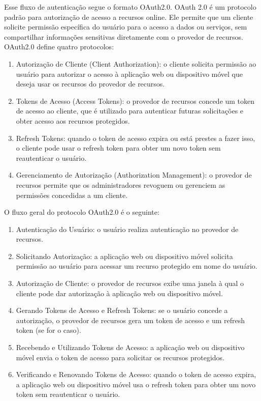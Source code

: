 Esse fluxo de autenticação segue o formato OAuth2.0. \acrfull{OAuth} 2.0 é um protocolo padrão para autorização de acesso a recursos online. Ele permite que um cliente solicite permissão específica do usuário para o acesso a dados ou serviços, sem compartilhar informações sensitivas diretamente com o provedor de recursos. OAuth2.0 define quatro protocolos:

\begin{enumerate}
  \item Autorização de Cliente (Client Authorization): o cliente solicita permissão ao usuário para autorizar o acesso à aplicação web ou dispositivo móvel que deseja usar os recursos do provedor de recursos.
  \item Tokens de Acesso (Access Tokens): o provedor de recursos concede um token de acesso ao cliente, que é utilizado para autenticar futuras solicitações e obter acesso aos recursos protegidos.
  \item Refresh Tokens: quando o token de acesso expira ou está prestes a fazer isso, o cliente pode usar o refresh token para obter um novo token sem reautenticar o usuário.
  \item Gerenciamento de Autorização (Authorization Management): o provedor de recursos permite que os administradores revoguem ou gerenciem as permissões concedidas a um cliente.
\end{enumerate}

O fluxo geral do protocolo OAuth2.0 é o seguinte:

\begin{enumerate}
  \item Autenticação do Usuário: o usuário realiza autenticação no provedor de recursos.
  \item Solicitando Autorização: a aplicação web ou dispositivo móvel solicita permissão ao usuário para acessar um recurso protegido em nome do usuário.
  \item Autorização de Cliente: o provedor de recursos exibe uma janela à qual o cliente pode dar autorização à aplicação web ou dispositivo móvel.
  \item Gerando Tokens de Acesso e Refresh Tokens: se o usuário concede a autorização, o provedor de recursos gera um token de acesso e um refresh token (se for o caso).
  \item Recebendo e Utilizando Tokens de Acesso: a aplicação web ou dispositivo móvel envia o token de acesso para solicitar os recursos protegidos.
  \item Verificando e Renovando Tokens de Acesso: quando o token de acesso expira, a aplicação web ou dispositivo móvel usa o refresh token para obter um novo token sem reautenticar o usuário.
\end{enumerate}

